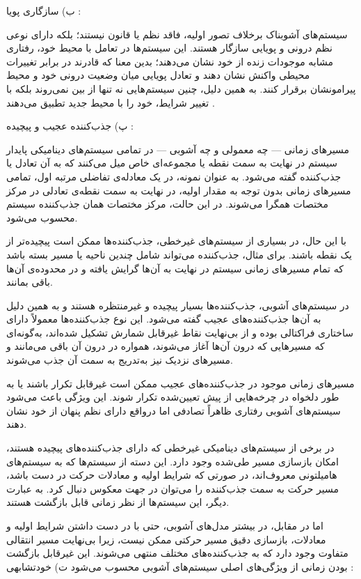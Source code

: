 ب) سازگاری پویا :

سیستم‌های آشوبناک برخلاف تصور اولیه، فاقد نظم یا قانون نیستند؛ بلکه دارای نوعی نظم درونی و پویایی سازگار هستند. این سیستم‌ها در تعامل با محیط خود، رفتاری مشابه موجودات زنده از خود نشان می‌دهند؛ بدین معنا که قادرند در برابر تغییرات محیطی واکنش نشان دهند و تعادل پویایی میان وضعیت درونی خود و محیط پیرامونشان برقرار کنند. به همین دلیل، چنین سیستم‌هایی نه تنها از بین نمی‌روند بلکه با تغییر شرایط، خود را با محیط جدید تطبیق می‌دهند \cite{ref41}.

پ) جذب‌کننده عجیب و پیچیده :

در تمامی سیستم‌های دینامیکی پایدار ‎---‎ چه معمولی و چه آشوبی ‎---‎ مسیرهای زمانی سیستم در نهایت به سمت نقطه یا مجموعه‌ای خاص میل می‌کنند که به آن تعادل یا جذب‌کننده گفته می‌شود. به عنوان نمونه، در یک معادله‌ی تفاضلی مرتبه اول، تمامی مسیرهای زمانی بدون توجه به مقدار اولیه، در نهایت به سمت نقطه‌ی تعادلی در مرکز مختصات همگرا می‌شوند. در این حالت، مرکز مختصات همان جذب‌کننده سیستم محسوب می‌شود.

با این حال، در بسیاری از سیستم‌های غیرخطی، جذب‌کننده‌ها ممکن است پیچیده‌تر از یک نقطه باشند. برای مثال، جذب‌کننده می‌تواند شامل چندین ناحیه یا مسیر بسته باشد که تمام مسیرهای زمانی سیستم در نهایت به آن‌ها گرایش یافته و در محدوده‌ی آن‌ها باقی بمانند.

در سیستم‌های آشوبی، جذب‌کننده‌ها بسیار پیچیده و غیرمنتظره هستند و به همین دلیل به آن‌ها جذب‌کننده‌های عجیب گفته می‌شود. این نوع جذب‌کننده‌ها معمولاً دارای ساختاری فراکتالی بوده و از بی‌نهایت نقاط غیرقابل شمارش تشکیل شده‌اند، به‌گونه‌ای که مسیرهایی که درون آن‌ها آغاز می‌شوند، همواره در درون آن باقی می‌مانند و مسیرهای نزدیک نیز به‌تدریج به سمت آن جذب می‌شوند\cite{ref46}.

مسیرهای زمانی موجود در جذب‌کننده‌های عجیب ممکن است غیرقابل تکرار باشند یا به طور دلخواه در چرخه‌هایی از پیش تعیین‌شده تکرار شوند. این ویژگی باعث می‌شود سیستم‌های آشوبی رفتاری ظاهراً تصادفی اما درواقع دارای نظم پنهان از خود نشان دهند.

در برخی از سیستم‌های دینامیکی غیرخطی که دارای جذب‌کننده‌های پیچیده هستند، امکان بازسازی مسیر طی‌شده وجود دارد. این دسته از سیستم‌ها که به سیستم‌های هامیلتونی  معروف‌اند، در صورتی که شرایط اولیه و معادلات حرکت در دست باشد، مسیر حرکت به سمت جذب‌کننده را می‌توان در جهت معکوس دنبال کرد. به عبارت دیگر، این سیستم‌ها از نظر زمانی قابل بازگشت هستند.

اما در مقابل، در بیشتر مدل‌های آشوبی، حتی با در دست داشتن شرایط اولیه و معادلات، بازسازی دقیق مسیر حرکتی ممکن نیست، زیرا بی‌نهایت مسیر انتقالی متفاوت وجود دارد که به جذب‌کننده‌های مختلف منتهی می‌شوند. این غیرقابل بازگشت بودن زمانی از ویژگی‌های اصلی سیستم‌های آشوبی محسوب می‌شود ت) خودتشابهی :

